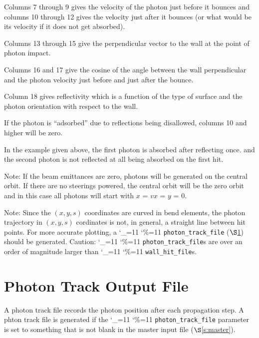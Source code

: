\documentclass[11pt,openany]{report}
\newcommand{\sref}[1]{$\S$\ref{#1}}
\newcommand\ttcmd{\begingroup\catcode`\_=11 \catcode`\%=11 \dottcmd}
\newcommand\dottcmd[1]{\texttt{#1}\endgroup}
\newcommand{\vn}{\ttcmd}
\begin{document}
{{Columns 7 through 9 gives the velocity of the photon just before it bounces and columns 10
through 12 gives the velocity just after it bounces (or what would be its velocity if it
does not get absorbed).

Columns 13 through 15 give the perpendicular vector to the wall at the point of photon
impact.

Columns 16 and 17 give the cosine of the angle between the wall perpendicular and the
photon velocity just before and just after the bounce.

Column 18 gives reflectivity which is a function of the type of surface and the photon
orientation with respect to the wall.

If the photon is ``adsorbed'' due to reflections being disallowed, columns 10 and
higher will be zero.

In the example given above, the first photon is absorbed after reflecting once.
and the second photon is not reflected at all being absorbed on the first hit.

Note: If the beam emittances are zero, photons will be generated on
the central orbit. If there are no steerings powered, the central
orbit will be the zero orbit and in this case all photons will start
with $x$ = $vx$ = $y$ = 0.

Note: Since the $(x,y,s)$ coordinates are curved in bend elements, the photon trajectory
in $(x,y,s)$ cordinates is not, in general, a straight line between hit points. For more
accurate plotting, a \vn{photon_track_file} (\sref{s:photon.track.file}) should be
generated. Caution: \vn{photon_track_file}s are over an order of magnitude larger than
\vn{wall_hit_file}s.

\section{Photon Track Output File}
\label{s:photon.track.file}

A photon track file records the photon position after each propagation step.
A phton track file is generated if the \vn{photon_track_file} parameter is
set to something that is not blank in the master input file (\sref{s:master}).

}}
\end{document}
